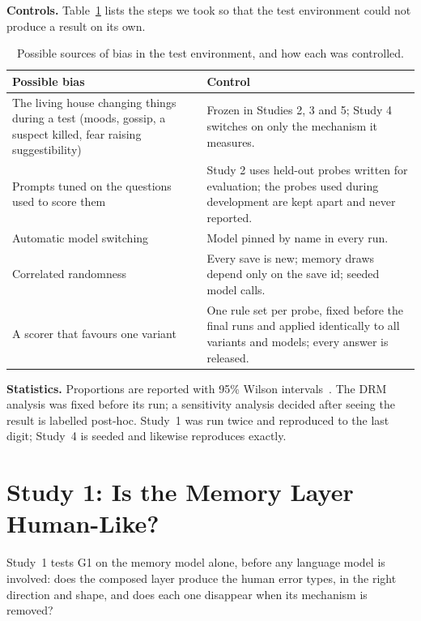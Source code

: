 \documentclass[conference]{IEEEtran}
\begin{document}
\textbf{Controls.} Table~\ref{tab:controls} lists the steps we took so that the test environment
could not produce a result on its own.

\begin{table}[t]
\centering
\caption{Possible sources of bias in the test environment, and how each was controlled.}
\label{tab:controls}
\footnotesize
\begin{tabular}{p{}p{}}
\toprule
Possible bias & Control\\
\midrule
The living house changing things during a test (moods, gossip, a suspect killed, fear raising suggestibility) &
Frozen in Studies 2, 3 and 5; Study 4 switches on only the mechanism it measures.\\
Prompts tuned on the questions used to score them &
Study 2 uses held-out probes written for evaluation; the probes used during development are kept
apart and never reported.\\
Automatic model switching & Model pinned by name in every run.\\
Correlated randomness & Every save is new; memory draws depend only on the save id; seeded model calls.\\
A scorer that favours one variant & One rule set per probe, fixed before the final runs and applied
identically to all variants and models; every answer is released.\\
\bottomrule
\end{tabular}
\end{table}

\textbf{Statistics.} Proportions are reported with 95\% Wilson intervals~\cite{wilson1927}. The DRM
analysis was fixed before its run; a sensitivity analysis decided after seeing the result is labelled
post-hoc. Study~1 was run twice and reproduced to the last digit; Study~4 is seeded and likewise
reproduces exactly.

\section{Study 1: Is the Memory Layer Human-Like?}
\label{sec:study1}

Study~1 tests G1 on the memory model alone, before any language model is involved: does the
composed layer produce the human error types, in the right direction and shape, and does each one
disappear when its mechanism is removed?
\end{document}
